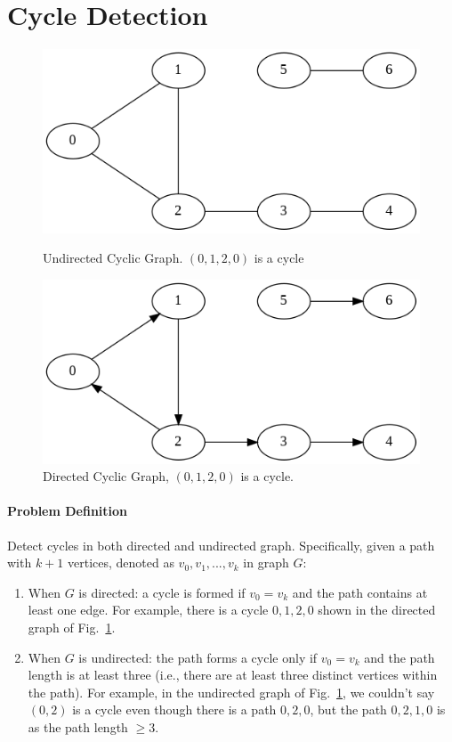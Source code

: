\documentclass[../main.tex]{subfiles}
\begin{document}
\section{Cycle Detection}
\label{sec_cycle_dection}
\begin{figure}[!ht]
    \centering
    \includegraphics[width=0.49\columnwidth] {fig/chapter_advanced_graph/undirected_cyclic_graph.png}
    \caption{Undirected Cyclic Graph. $(0, 1, 2, 0)$ is a cycle}
    \label{fig:advanced_graph_ucg}
    \includegraphics[width=0.49\columnwidth] {fig/chapter_advanced_graph/directed_cyclic_graph.png}
    \caption{Directed Cyclic Graph, $(0, 1, 2, 0)$ is a cycle.}
    \label{fig:cc_cycle}
\end{figure}
\paragraph{Problem Definition}
Detect cycles in both directed and undirected graph. Specifically, given a path with $k+1$ vertices, denoted as ${v_0, v_1, ..., v_k}$ in graph $G$:
\begin{enumerate}
    \item When $G$ is directed: a cycle is formed if $v_0=v_k$ and the path contains at least one edge.  For example,  there is a cycle ${0, 1, 2, 0}$ shown in the directed graph of Fig.~\ref{fig:cc_cycle}.
    \item When $G$ is undirected: the path forms a cycle only if $v_0=v_k$ and the path length is at least three (i.e., there are at least three distinct vertices within the path). For example, in the undirected graph of Fig.~\ref{fig:cc_cycle}, we couldn't say $(0, 2)$ is a cycle even though there is a path ${0, 2, 0}$, but the path ${0, 2, 1, 0}$ is as the path length $\geq 3$.
\end{enumerate}
\end{document}
